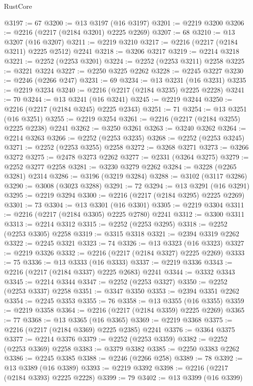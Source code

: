\begin{lexlean}{RustCore}
\begin{coremodule}
@3197 := 67
@3200 := @13 @3197 (@16 @3197)
@3201 := @2219 @3200
@3206 := @2216 (@2217 (@2184 @3201) @2225 @2269)
@3207 := 68
@3210 := @13 @3207 (@16 @3207)
@3211 := @2219 @3210
@3217 := @2216 (@2217 (@2184 @3211) @2225 @2512) @2241
@3218 := @3206 @3217
@3219 := @2214 @3218
@3221 := @2252 (@2253 @3201)
@3224 := @2252 (@2253 @3211) @2258
@3225 := @3221 @3224
@3227 := @2250 @3225 @2262
@3228 := @2245 @3227
@3230 := @2246 (@2266 @247)
@3231 := 69
@3234 := @13 @3231 (@16 @3231)
@3235 := @2219 @3234
@3240 := @2216 (@2217 (@2184 @3235) @2225 @2228)
@3241 := 70
@3244 := @13 @3241 (@16 @3241)
@3245 := @2219 @3244
@3250 := @2216 (@2217 (@2184 @3245) @2225 @2343)
@3251 := 71
@3254 := @13 @3251 (@16 @3251)
@3255 := @2219 @3254
@3261 := @2216 (@2217 (@2184 @3255) @2225 @2238) @2241
@3262 := @3250 @3261
@3263 := @3240 @3262
@3264 := @2214 @3263
@3266 := @2252 (@2253 @3235)
@3268 := @2252 (@2253 @3245)
@3271 := @2252 (@2253 @3255) @2258
@3272 := @3268 @3271
@3273 := @3266 @3272
@3275 := @2478 @3273 @2262
@3277 := @2331 (@3264 @3275)
@3279 := @2252 @3277 @2258
@3281 := @3230 @3279 @2262
@3284 := @3228 (@2265 @3281) @2314
@3286 := @3196 (@3219 @3284)
@3288 := @3102 (@3117 @3286)
@3290 := @3008 (@3023 @3288)
@3291 := 72
@3294 := @13 @3291 (@16 @3291)
@3295 := @2219 @3294
@3300 := @2216 (@2217 (@2184 @3295) @2225 @2269)
@3301 := 73
@3304 := @13 @3301 (@16 @3301)
@3305 := @2219 @3304
@3311 := @2216 (@2217 (@2184 @3305) @2225 @2780) @2241
@3312 := @3300 @3311
@3313 := @2214 @3312
@3315 := @2252 (@2253 @3295)
@3318 := @2252 (@2253 @3305) @2258
@3319 := @3315 @3318
@3321 := @2394 @3319 @2262
@3322 := @2245 @3321
@3323 := 74
@3326 := @13 @3323 (@16 @3323)
@3327 := @2219 @3326
@3332 := @2216 (@2217 (@2184 @3327) @2225 @2269)
@3333 := 75
@3336 := @13 @3333 (@16 @3333)
@3337 := @2219 @3336
@3343 := @2216 (@2217 (@2184 @3337) @2225 @2683) @2241
@3344 := @3332 @3343
@3345 := @2214 @3344
@3347 := @2252 (@2253 @3327)
@3350 := @2252 (@2253 @3337) @2258
@3351 := @3347 @3350
@3353 := @2394 @3351 @2262
@3354 := @2245 @3353
@3355 := 76
@3358 := @13 @3355 (@16 @3355)
@3359 := @2219 @3358
@3364 := @2216 (@2217 (@2184 @3359) @2225 @2269)
@3365 := 77
@3368 := @13 @3365 (@16 @3365)
@3369 := @2219 @3368
@3375 := @2216 (@2217 (@2184 @3369) @2225 @2385) @2241
@3376 := @3364 @3375
@3377 := @2214 @3376
@3379 := @2252 (@2253 @3359)
@3382 := @2252 (@2253 @3369) @2258
@3383 := @3379 @3382
@3385 := @2250 @3383 @2262
@3386 := @2245 @3385
@3388 := @2246 (@2266 @258)
@3389 := 78
@3392 := @13 @3389 (@16 @3389)
@3393 := @2219 @3392
@3398 := @2216 (@2217 (@2184 @3393) @2225 @2228)
@3399 := 79
@3402 := @13 @3399 (@16 @3399)

\end{coremodule}
\end{lexlean}
